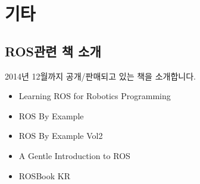 
\chapter{기타}

\section{ROS관련 책 소개}

2014년 12월까지 공개/판매되고 있는 책을 소개합니다.\\

\begin{itemize}
\item Learning ROS for Robotics Programming \cite*{martinez_2013}
\item ROS By Example \cite{goebel_2013}
\item ROS By Example Vol2 \cite{goebel_2014}
\item A Gentle Introduction to ROS \cite*{OKane201310}
\item ROSBook KR \cite{pyo_2014}
\end{itemize}

